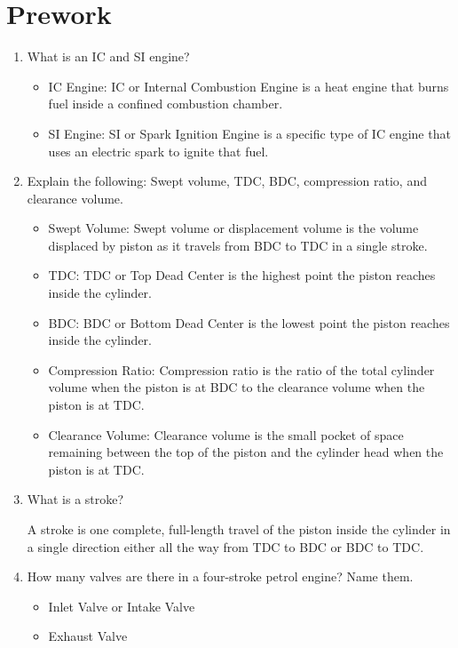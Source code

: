 \section{Prework}

\begin{enumerate}
	\item What is an IC and SI engine?

	      \begin{itemize}
		      \item IC Engine: IC or Internal Combustion Engine is a heat engine that burns fuel inside a confined combustion chamber.
		      \item SI Engine: SI or Spark Ignition Engine is a specific type of IC engine that uses an electric spark to ignite that fuel.
	      \end{itemize}

	\item Explain the following: Swept volume, TDC, BDC, compression ratio, and clearance volume.

	      \begin{itemize}
		      \item Swept Volume: Swept volume or displacement volume is the volume displaced by piston as it travels from BDC to TDC in a single stroke.
		      \item TDC: TDC or Top Dead Center is the highest point the piston reaches inside the cylinder.
		      \item BDC: BDC or Bottom Dead Center is the lowest point the piston reaches inside the cylinder.
		      \item Compression Ratio: Compression ratio is the ratio of the total cylinder volume when the piston is at BDC to the clearance volume when the piston is at TDC.
		      \item Clearance Volume: Clearance volume is the small pocket of space remaining between the top of the piston and the cylinder head when the piston is at TDC.
	      \end{itemize}

	\item What is a stroke?

	      A stroke is one complete, full-length travel of the piston inside the cylinder in a single direction either all the way from TDC to BDC or BDC to TDC.


	\item How many valves are there in a four-stroke petrol engine? Name them.

	      \begin{itemize}
		      \item Inlet Valve or Intake Valve
		      \item Exhaust Valve
	      \end{itemize}
\end{enumerate}
